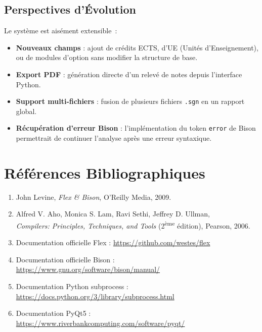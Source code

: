 \documentclass[a4paper,12pt]{article}
\begin{document}
\subsection{Perspectives d'Évolution}

Le système est aisément extensible~:
\begin{itemize}[leftmargin=1.5em]
  \item \textbf{Nouveaux champs} : ajout de crédits ECTS, d'UE (Unités d'Enseignement), ou de modules d'option sans modifier la structure de base.
  \item \textbf{Export PDF} : génération directe d'un relevé de notes depuis l'interface Python.
  \item \textbf{Support multi-fichiers} : fusion de plusieurs fichiers \texttt{.sgn} en un rapport global.
  \item \textbf{Récupération d'erreur Bison} : l'implémentation du token \texttt{error} de Bison permettrait de continuer l'analyse après une erreur syntaxique.
\end{itemize}

\section*{Références Bibliographiques}

\begin{enumerate}[leftmargin=1.5em]
  \item John Levine, \textit{Flex \& Bison}, O'Reilly Media, 2009.
  \item Alfred V. Aho, Monica S. Lam, Ravi Sethi, Jeffrey D. Ullman,\\
        \textit{Compilers: Principles, Techniques, and Tools} (2\textsuperscript{ème} édition), Pearson, 2006.
  \item Documentation officielle Flex : \url{https://github.com/westes/flex}
  \item Documentation officielle Bison : \url{https://www.gnu.org/software/bison/manual/}
  \item Documentation Python subprocess : \url{https://docs.python.org/3/library/subprocess.html}
  \item Documentation PyQt5 : \url{https://www.riverbankcomputing.com/software/pyqt/}
\end{enumerate}
\end{document}
